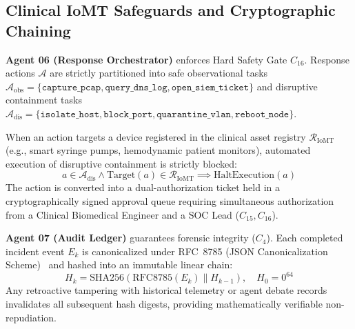 \documentclass{ieeeaccess}
\begin{document}
\subsection{Clinical IoMT Safeguards and Cryptographic Chaining}
\textbf{Agent 06 (Response Orchestrator)} enforces Hard Safety Gate $C_{16}$. Response actions $\mathcal{A}$ are strictly partitioned into safe observational tasks $\mathcal{A}_{\text{obs}} = \{\texttt{capture\_pcap}, \texttt{query\_dns\_log}, \texttt{open\_siem\_ticket}\}$ and disruptive containment tasks $\mathcal{A}_{\text{dis}} = \{\texttt{isolate\_host}, \texttt{block\_port}, \texttt{quarantine\_vlan}, \texttt{reboot\_node}\}$. 

When an action targets a device registered in the clinical asset registry $\mathcal{R}_{\text{IoMT}}$ (e.g., smart syringe pumps, hemodynamic patient monitors), automated execution of disruptive containment is strictly blocked:
\begin{equation}
a \in \mathcal{A}_{\text{dis}} \wedge \text{Target}(a) \in \mathcal{R}_{\text{IoMT}} \implies \text{HaltExecution}(a)
\end{equation}
The action is converted into a dual-authorization ticket held in a cryptographically signed approval queue requiring simultaneous authorization from a Clinical Biomedical Engineer and a SOC Lead ($C_{15}, C_{16}$).

\textbf{Agent 07 (Audit Ledger)} guarantees forensic integrity ($C_4$). Each completed incident event $E_k$ is canonicalized under RFC~8785 (JSON Canonicalization Scheme)~\cite{rfc8785} and hashed into an immutable linear chain:
\begin{equation}
H_k = \text{SHA256}\left( \text{RFC8785}(E_k) \parallel H_{k-1} \right), \quad H_0 = 0^{64}
\end{equation}
Any retroactive tampering with historical telemetry or agent debate records invalidates all subsequent hash digests, providing mathematically verifiable non-repudiation.
\end{document}
